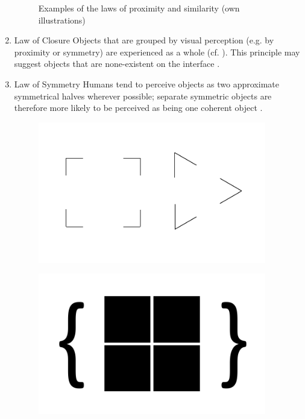 \begin{enumerate}
\begin{figure}[H]
        \caption[Laws of Proximity and Similarity]{Examples of the laws of proximity and similarity (own illustrations)}\label{fig:law1}
    \end{figure}
    \item{Law of Closure} Objects that are grouped by visual perception (e.g. by proximity or symmetry) are experienced as a whole (cf. ). This principle may suggest objects that are none-existent on the interface \parencite[cf.][]{Stevenson.n.y.}.
    \item{Law of Symmetry} Humans tend to perceive objects as two approximate symmetrical halves wherever possible; separate symmetric objects are therefore more likely to be perceived as being one coherent object \parencite[cf.][]{Soegaard.n.y.}.
    \begin{figure}[H] 
        \begin{minipage}[b]{.5\linewidth}
            \centering\includegraphics[width=0.94\textwidth]{img/closure.pdf}
            \label{fig:clo}
        \end{minipage}%
        \begin{minipage}[b]{.5\linewidth}
            \centering\includegraphics[width=0.94\textwidth]{img/symmetry.pdf}

\end{minipage}
\end{figure}
\end{enumerate}
